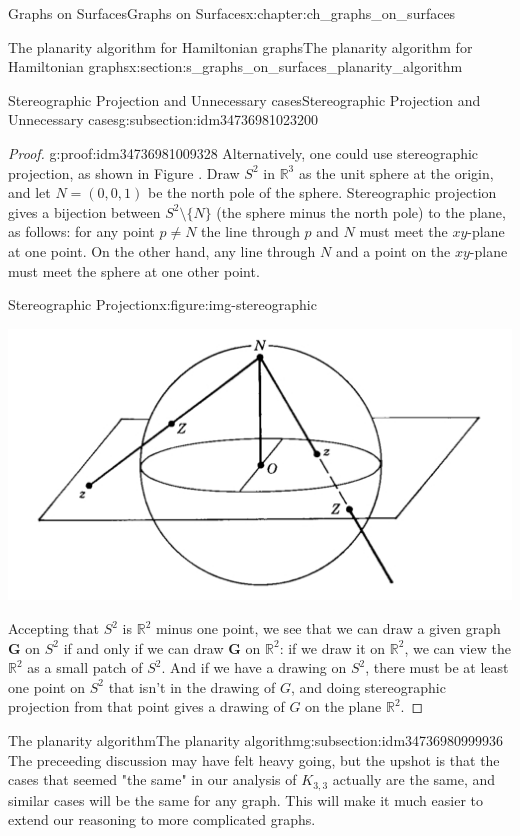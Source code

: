 \documentclass[oneside,10pt,]{book}
\numberwithin{equation}{section}
\newcommand{\reals}{\mathbb{R}}
\newcommand{\bfG}{\mathbf{G}}
\begin{document}
\begin{chapterptx}{Graphs on Surfaces}{}{Graphs on Surfaces}{}{}{x:chapter:ch_graphs_on_surfaces}
\begin{sectionptx}{The planarity algorithm for Hamiltonian graphs}{}{The planarity algorithm for Hamiltonian graphs}{}{}{x:section:s_graphs_on_surfaces_planarity_algorithm}
\begin{subsectionptx}{Stereographic Projection and Unnecessary cases}{}{Stereographic Projection and Unnecessary cases}{}{}{g:subsection:idm34736981023200}
\begin{proof}{}{g:proof:idm34736981009328}
Alternatively, one could use stereographic projection, as shown in Figure .  Draw \(S^2\) in \(\reals^3\) as the unit sphere at the origin, and let \(N=(0,0,1)\) be the north pole of the sphere.  Stereographic projection gives a bijection between \(S^2\setminus\{N\}\) (the sphere minus the north pole) to the plane, as follows: for any point \(p\neq N\) the line through \(p\) and \(N\) must meet the \(xy\)-plane at one point.  On the other hand, any line through \(N\) and a point on the \(xy\)-plane must meet the sphere at one other point.%
\begin{figureptx}{Stereographic Projection}{x:figure:img-stereographic}{}%
\begin{image}{0.05}{0.9}{0.05}%
\includegraphics[width=\linewidth]{images/stereographic.jpg}
\end{image}%
\tcblower
\end{figureptx}%
Accepting that \(S^2\) is \(\reals^2\) minus one point, we see that we can draw a given graph \(\bfG\) on \(S^2\) if and only if we can draw \(\bfG\) on \(\reals^2\): if we draw it on \(\reals^2\), we can view the \(\reals^2\) as a small patch of \(S^2\). And if we have a drawing on \(S^2\), there must be at least one point on \(S^2\) that isn't in the drawing of \(G\), and doing stereographic projection from that point gives a drawing of \(G\) on the plane \(\reals^2\).%
\end{proof}
\end{subsectionptx}
%
%
\typeout{************************************************}
\typeout{************************************************}
%
\begin{subsectionptx}{The planarity algorithm}{}{The planarity algorithm}{}{}{g:subsection:idm34736980999936}
The preceeding discussion may have felt heavy going, but the upshot is that the cases that seemed "the same" in our analysis of \(K_{3,3}\) actually are the same, and similar cases will be the same for any graph. This will make it much easier to extend our reasoning to more complicated graphs.%

\end{subsectionptx}
\end{sectionptx}
\end{chapterptx}
\end{document}
